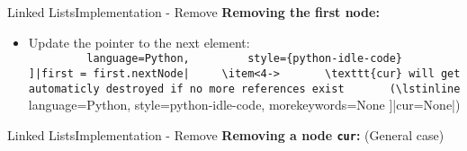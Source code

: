 


\begin{frame}{Linked Lists}{Implementation - Remove}
  \textbf{Removing the first node:}
    \begin{flushleft}
    
  \end{flushleft}
  \begin{itemize}
    \item<3->
      Update the pointer to the next element:\\
      \lstinline[
        language=Python,
        style={python-idle-code}
      ]|first = first.nextNode|
    \item<4->
      \texttt{cur} will get automaticly destroyed if no more references exist
      (\lstinline[
        language=Python,
        style={python-idle-code},
        morekeywords={None}
      ]|cur=None|)
  \end{itemize}
  \begin{flushright}
    
  \end{flushright}
\end{frame}


\begin{frame}[fragile]{Linked Lists}{Implementation - Remove}
  \textbf{Removing a node \texttt{cur}:} (General case)
  
\end{frame}


